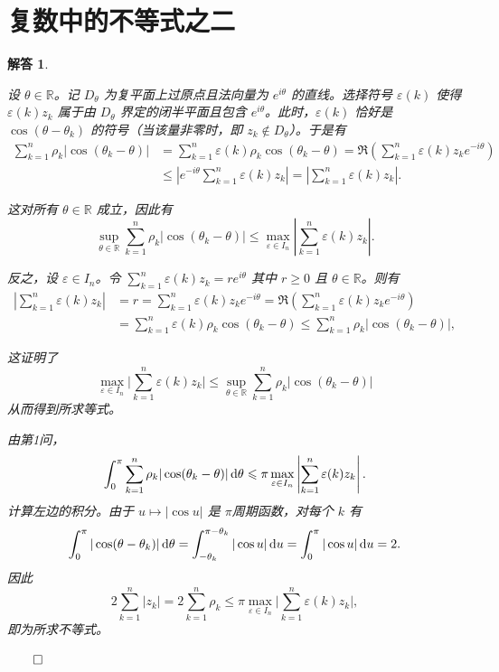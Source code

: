 \documentclass[12pt,UTF8,fontset=none]{ctexbook}
\theoremstyle{exercisestyle}
\theoremstyle{solutionstyle}
\newtheorem*{solution*}{解答}
\newenvironment{solution}
  {\begin{solution*}}
  {\hfill\ensuremath{\qed}\end{solution*}}
\begin{document}
\section{复数中的不等式之二}
\begin{solution}
\begin{subquestions}
\item 设 \( \theta \in \mathbb{R} \)。记 \( D_{\theta} \) 为复平面上过原点且法向量为 \( e^{i\theta} \) 的直线。选择符号 \( \varepsilon(k) \) 使得 \( \varepsilon(k)z_k \) 属于由 \( D_{\theta} \) 界定的闭半平面且包含 \( e^{i\theta} \)。此时，\( \varepsilon(k) \) 恰好是 \( \cos(\theta - \theta_k) \) 的符号（当该量非零时，即 \( z_k \notin D_\theta \)）。于是有
\begin{align*}
\sum_{k=1}^{n} \rho_k |\cos(\theta_k - \theta)| &= \sum_{k=1}^{n} \varepsilon(k)\rho_k \cos(\theta_k - \theta) = \Re \left(\sum_{k=1}^{n} \varepsilon(k)z_k e^{-i\theta}\right)\\
&\leqslant \left|e^{-i\theta} \sum_{k=1}^{n} \varepsilon(k)z_k\right| = \left|\sum_{k=1}^{n} \varepsilon(k)z_k\right|.
\end{align*}

这对所有 \( \theta \in \mathbb{R} \) 成立，因此有
\[
\sup_{\theta \in \mathbb{R}} \sum_{k=1}^n \rho_k |\cos(\theta_k - \theta)| \leqslant \max_{\varepsilon \in I_n} \left| \sum_{k=1}^n \varepsilon(k) z_k \right|.
\]

反之，设 \( \varepsilon \in I_n \)。令 \( \sum_{k=1}^n \varepsilon(k) z_k = r e^{i\theta} \) 其中 \( r \geq 0 \) 且 \( \theta \in \mathbb{R} \)。则有
\begin{align*}  
\left| \sum_{k=1}^{n} \varepsilon(k) z_k \right| &= r = \sum_{k=1}^{n} \varepsilon(k) z_k e^{-i\theta} = \Re \left( \sum_{k=1}^{n} \varepsilon(k) z_k e^{-i\theta} \right) \\
&= \sum_{k=1}^{n} \varepsilon(k) \rho_k \cos(\theta_k - \theta) \leqslant \sum_{k=1}^{n} \rho_k |\cos(\theta_k - \theta)|,
\end{align*}

这证明了
\[
\max_{\varepsilon \in I_n} \Big| \sum_{k=1}^n \varepsilon(k) z_k \Big| \leqslant \sup_{\theta \in \mathbb{R}} \sum_{k=1}^n \rho_k |\cos(\theta_k - \theta)|
\]
从而得到所求等式。

\item 由第1问，
\[
\int_0^{\pi} \sum_{k=1}^n \rho_k |\cos(\theta_k - \theta)| \,\mathrm{d}\theta \leqslant \pi \max_{\varepsilon \in I_n} \left| \sum_{k=1}^n \varepsilon(k) z_k \right|.
\]
计算左边的积分。由于 \( u \mapsto |\cos u| \) 是 \(\pi\)\dash 周期函数，对每个 \(k\) 有
\[
\int_0^{\pi} |\cos(\theta - \theta_k)| \,\mathrm{d}\theta = \int_{-\theta_k}^{\pi - \theta_k} |\cos u| \,\mathrm{d}u = \int_0^{\pi} |\cos u| \,\mathrm{d}u = 2.
\]
因此
\[
2\sum_{k=1}^{n}|z_{k}|=2\sum_{k=1}^{n}\rho_{k}\leqslant\pi\max_{\varepsilon\in I_{n}}\Big|\sum_{k=1}^{n}\varepsilon(k)z_{k}\Big|,
\]
即为所求不等式。


\end{subquestions}
\end{solution}
\end{document}
